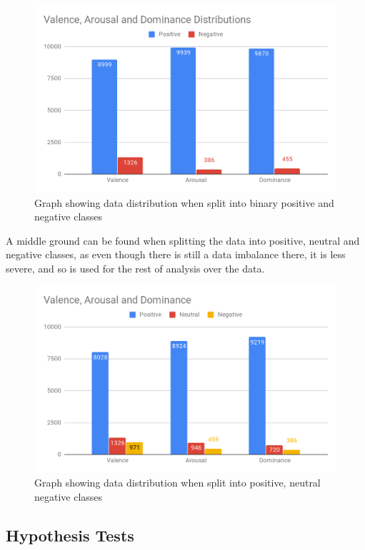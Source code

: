 \begin{figure}[h]
\caption{Graph showing data distribution when split into binary positive and negative classes}
\centering
\includegraphics[scale=0.3]{graphs/binaryDist.png}
\end{figure}

A middle ground can be found when splitting the data into positive, neutral and negative classes, as even though there is still a data imbalance there, it is less severe, and so is used for the rest of analysis over the data.

\begin{figure}[h]
\caption{Graph showing data distribution when split into positive, neutral negative classes}
\centering
\includegraphics[scale=0.3]{graphs/nonBinaryDist.png}
\end{figure}


\subsection{Hypothesis Tests}


